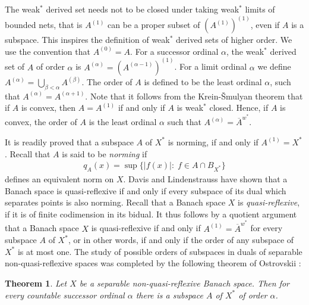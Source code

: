 \documentclass{amsart}
\newtheorem{theorem}{Theorem}[section]
\theoremstyle{definition}
\begin{document}
The weak$^*$ derived set needs not to be closed under taking weak$^*$ limits of bounded nets, that is $A^{(1)}$ can be a proper subset of $\left( A^{(1)} \right)^{(1)}$, even if $A$ is a subspace. This inspires the definition of weak$^*$ derived sets of higher order. We use the convention that $A^{(0)} = A$. For a successor ordinal $\alpha$, the weak$^*$ derived set of $A$ of order $\alpha$ is $A^{(\alpha)} =\left(A^{(\alpha - 1)}\right)^{(1)}$. For a limit ordinal $\alpha$ we define $A^{(\alpha)} = \bigcup_{\beta < \alpha} A^{(\beta)}$. The order of $A$ is defined to be the least ordinal $\alpha$, such that $A^{(\alpha)} = A^{(\alpha + 1)}$. Note that it follows from the Krein-Šmulyan theorem that if $A$ is convex, then $A = A^{(1)}$ if and only if $A$ is weak$^*$ closed. Hence, if $A$ is convex, the order of $A$ is the least ordinal $\alpha$ such that $A^{(\alpha)} = \overline{A}^{w^*}$.

It is readily proved that a subspace $A$ of $X^*$ is norming, if and only if $A^{(1)} = X^*$. Recall that $A$ is said to be \textit{norming} if
\begin{align*}
    q_A(x) = \sup \{|f(x)|: \; f \in A \cap B_{X^*}\}
\end{align*}
defines an equivalent norm on $X$. Davis and Lindenstrauss \cite{DavisLinden} have shown that a Banach space is quasi-reflexive if and only if every subspace of its dual which separates points is also norming. Recall that a Banach space $X$ is \textit{quasi-reflexive}, if it is of finite codimension in its bidual. It thus follows by a quotient argument that a Banach space $X$ is quasi-reflexive if and only if $A^{(1)} = \overline{A}^{w^*}$ for every subspace $A$ of $X^*$, or in other words, if and only if the order of any subspace of $X^*$ is at most one. The study of possible orders of subspaces in duals of separable non-quasi-reflexive spaces was completed by the following theorem of Ostrovskii \cite{Ostrovskii1987}:

\begin{theorem} \label{Theorem:SepNonQR}
    Let $X$ be a separable non-quasi-reflexive Banach space. Then for every countable successor ordinal $\alpha$ there is a subspace $A$ of $X^*$ of order $\alpha$.
\end{theorem}
\end{document}
